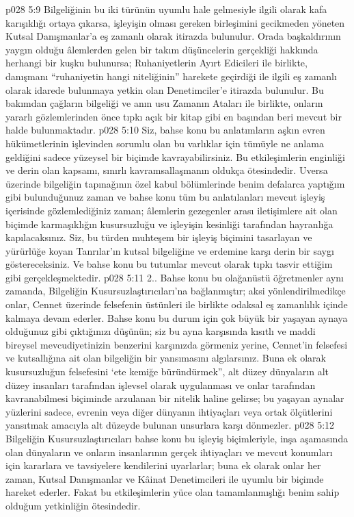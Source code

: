 \vs p028 5:9 Bilgeliğinin bu iki türünün uyumlu hale gelmesiyle ilgili olarak kafa karışıklığı ortaya çıkarsa, işleyişin olması gereken birleşimini gecikmeden yöneten Kutsal Danışmanlar’a eş zamanlı olarak itirazda bulunulur. Orada başkaldırının yaygın olduğu âlemlerden gelen bir takım düşüncelerin gerçekliği hakkında herhangi bir kuşku bulunursa; Ruhaniyetlerin Ayırt Edicileri ile birlikte, danışmanı “ruhaniyetin hangi niteliğinin” harekete geçirdiği ile ilgili eş zamanlı olarak idarede bulunmaya yetkin olan Denetimciler’e itirazda bulunulur. Bu bakımdan çağların bilgeliği ve anın usu Zamanın Ataları ile birlikte, onların yararlı gözlemlerinden önce tıpkı açık bir kitap gibi en başından beri mevcut bir halde bulunmaktadır.
\vs p028 5:10 Siz, bahse konu bu anlatımların aşkın evren hükümetlerinin işlevinden sorumlu olan bu varlıklar için tümüyle ne anlama geldiğini sadece yüzeysel bir biçimde kavrayabilirsiniz. Bu etkileşimlerin enginliği ve derin olan kapsamı, sınırlı kavramsallaşmanın oldukça ötesindedir. Uversa üzerinde bilgeliğin tapınağının özel kabul bölümlerinde benim defalarca yaptığım gibi bulunduğunuz zaman ve bahse konu tüm bu anlatılanları mevcut işleyiş içerisinde gözlemlediğiniz zaman; âlemlerin gezegenler arası iletişimlere ait olan biçimde karmaşıklığın kusursuzluğu ve işleyişin kesinliği tarafından hayranlığa kapılacaksınız. Siz, bu türden muhteşem bir işleyiş biçimini tasarlayan ve yürürlüğe koyan Tanrılar’ın kutsal bilgeliğine ve erdemine karşı derin bir saygı göstereceksiniz. Ve bahse konu bu tutumlar mevcut olarak tıpkı tasvir ettiğim gibi gerçekleşmektedir.
\vs p028 5:11 2.\bibnobreakspace {}. Bahse konu bu olağanüstü öğretmenler aynı zamanda, Bilgeliğin Kusursuzlaştırıcıları’na bağlanmıştır; aksi yönlendirilmedikçe onlar, Cennet üzerinde felsefenin üstünleri ile birlikte odaksal eş zamanlılık içinde kalmaya devam ederler. Bahse konu bu durum için çok büyük bir yaşayan aynaya olduğunuz gibi çıktığınızı düşünün; siz bu ayna karşısında kısıtlı ve maddi bireysel mevcudiyetinizin benzerini karşınızda görmeniz yerine, Cennet’in felsefesi ve kutsallığına ait olan bilgeliğin bir yansımasını algılarsınız. Buna ek olarak kusursuzluğun felsefesini ‘ete kemiğe büründürmek”, alt düzey dünyaların alt düzey insanları tarafından işlevsel olarak uygulanması ve onlar tarafından kavranabilmesi biçiminde arzulanan bir nitelik haline gelirse; bu yaşayan aynalar yüzlerini sadece, evrenin veya diğer dünyanın ihtiyaçları veya ortak ölçütlerini yansıtmak amacıyla alt düzeyde bulunan unsurlara karşı dönmezler.
\vs p028 5:12 Bilgeliğin Kusursuzlaştırıcıları bahse konu bu işleyiş biçimleriyle, inşa aşamasında olan dünyaların ve onların insanlarının gerçek ihtiyaçları ve mevcut konumları için kararlara ve tavsiyelere kendilerini uyarlarlar; buna ek olarak onlar her zaman, Kutsal Danışmanlar ve Kâinat Denetimcileri ile uyumlu bir biçimde hareket ederler. Fakat bu etkileşimlerin yüce olan tamamlanmışlığı benim sahip olduğum yetkinliğin ötesindedir.
